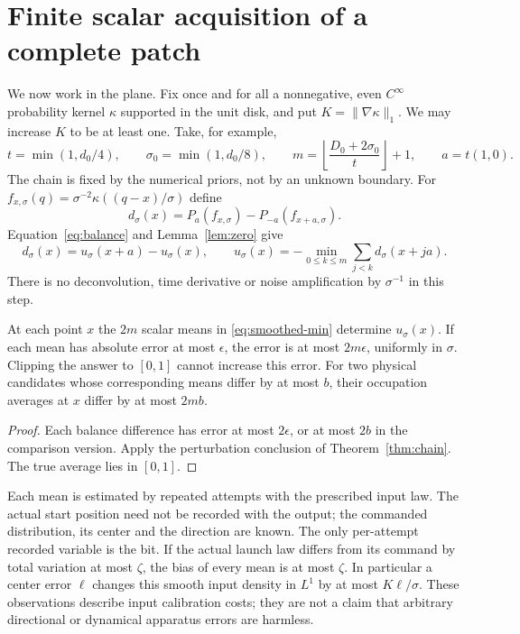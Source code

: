 \section{Finite scalar acquisition of a complete patch}
\label{sec:acquisition}
We now work in the plane. Fix once and for all a nonnegative, even
$C^\infty$ probability kernel $\kappa$ supported in the unit disk, and
put $K=\|\nabla\kappa\|_1$. We may increase $K$ to be at least one.
Take, for example,
\begin{equation}\label{eq:design}
 t=\min(1,d_0/4),\qquad \sigma_0=\min(1,d_0/8),\qquad
 m=\left\lfloor\frac{D_0+2\sigma_0}{t}\right\rfloor+1,
 \qquad a=t(1,0).
\end{equation}
The chain is fixed by the numerical priors, not by an unknown boundary.
For $f_{x,\sigma}(q)=\sigma^{-2}\kappa((q-x)/\sigma)$ define
\[
 d_\sigma(x)=P_a(f_{x,\sigma})-P_{-a}(f_{x+a,\sigma}).
\]
Equation~\eqref{eq:balance} and Lemma~\ref{lem:zero} give
\begin{equation}\label{eq:smoothed-min}
 d_\sigma(x)=u_\sigma(x+a)-u_\sigma(x),\qquad
 u_\sigma(x)=-\min_{0\le k\le m}\sum_{j<k}d_\sigma(x+ja).
\end{equation}
There is no deconvolution, time derivative or noise amplification by
$\sigma^{-1}$ in this step.

\begin{proposition}
\label{prop:mean-stability}
At each point $x$ the $2m$ scalar means in \eqref{eq:smoothed-min}
determine $u_\sigma(x)$. If each mean has absolute error at most
$\epsilon$, the error is at most $2m\epsilon$, uniformly in $\sigma$.
Clipping the answer to $[0,1]$ cannot increase this error. For two
physical candidates whose corresponding means differ by at most $b$,
their occupation averages at $x$ differ by at most $2mb$.
\end{proposition}
\begin{proof}
Each balance difference has error at most $2\epsilon$, or at most
$2b$ in the comparison version. Apply the perturbation conclusion of
Theorem~\ref{thm:chain}. The true average lies in $[0,1]$.
\end{proof}

Each mean is estimated by repeated attempts with the prescribed input
law. The actual start position need not be recorded with the output;
the commanded distribution, its center and the direction are known.
The only per-attempt recorded variable is the bit. If the actual launch
law differs from its command by total variation at most $\zeta$, the
bias of every mean is at most $\zeta$. In particular a center error
$\ell$ changes this smooth input density in $L^1$ by at most
$K\ell/\sigma$. These observations describe input calibration costs;
they are not a claim that arbitrary directional or dynamical apparatus
errors are harmless.

